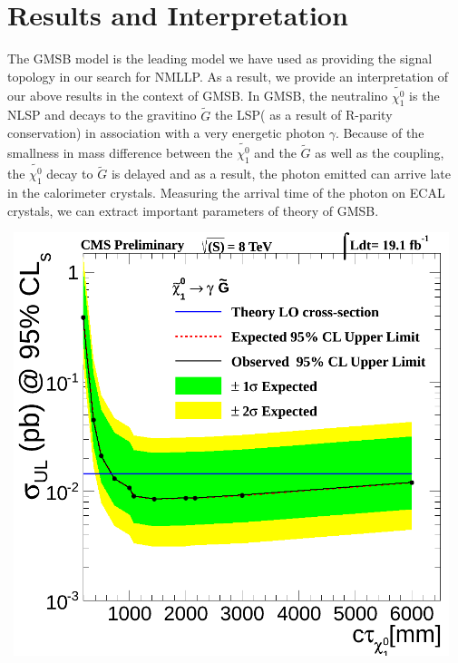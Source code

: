 \chapter{Results and Interpretation}
\label{Result_interpretation_chapter}
The GMSB model is the leading model we have used as providing the signal topology in our search for NMLLP. As a result, we provide an interpretation of our above results in the context of GMSB.
In GMSB, the neutralino $\tilde{\chi^{0}_{1}}$ is the NLSP and decays to the
gravitino $\tilde{G}$ the LSP( as a result of R-parity conservation) in association with a very energetic photon $\gamma$. Because of the smallness in mass difference between the  $\tilde{\chi^{0}_{1}}$ and the $\tilde{G}$ as well as the coupling, the $\tilde{\chi^{0}_{1}}$ decay to $\tilde{G}$ is delayed and as a result, the photon emitted can arrive late in the calorimeter crystals.  Measuring the arrival time of the photon on ECAL crystals, we can extract important parameters of  theory of GMSB.

\begin{center}
\centering
\mbox{
\includegraphics[width=5in]{THESISPLOTS/Neutralino_L180TeV_2JetsUplimit_Private_GMSB_Samples.png}}
\label{fig:SPS8_Ulimit}
\end{center}
